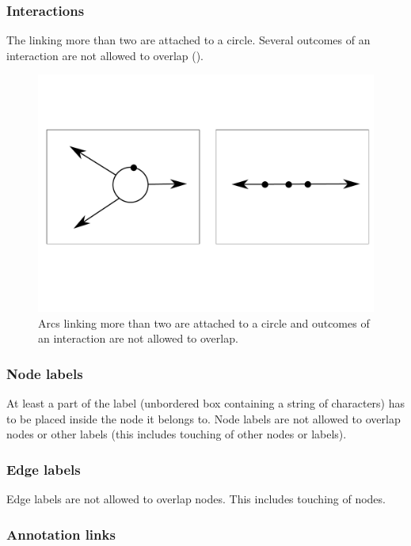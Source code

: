 \subsubsection{Interactions}

The  linking more than two  are attached to a circle. Several outcomes of an interaction are not allowed to overlap ().

\begin{figure}[h!]
  \centering
  \includegraphics[scale=0.3]{images/layout-connecting-arcs}
  \caption{Arcs linking more than two  are attached to a circle and outcomes of an interaction are not allowed to overlap.}\label{fig:layout6}
\end{figure}

\subsubsection{Node labels}

At least a part of the label (unbordered box containing a string of characters) has to be placed inside the node it belongs to. Node labels are not allowed to overlap nodes or other labels (this includes touching of other nodes or labels).

\subsubsection{Edge labels}

Edge labels are not allowed to overlap nodes. This includes touching of nodes.

\subsubsection{Annotation links}

